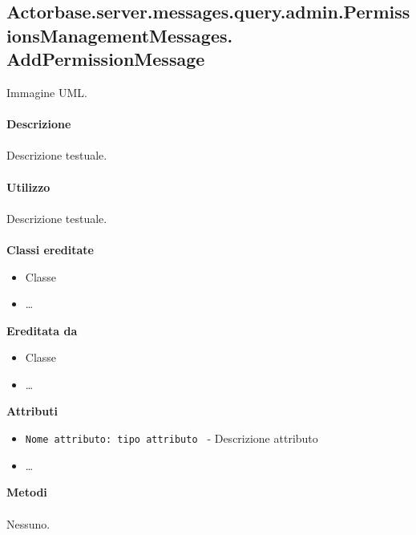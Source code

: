 \documentclass[a4paper]{article}
\begin{document}
\subsection{Actorbase.server.messages.query.admin.PermissionsManagementMessages.
\newline AddPermissionMessage}
		Immagine UML.
		\\ \\
		\textbf{Descrizione}
			\\ \\
			Descrizione testuale.
			\\ \\
		\textbf{Utilizzo}
			\\ \\
			Descrizione testuale.
			\\ \\
		\textbf{Classi ereditate}
			\begin{itemize}
				\item Classe
				\item \dots
			\end{itemize}
		\textbf{Ereditata da}
			\begin{itemize}
				\item Classe
				\item \dots
			\end{itemize}
		\textbf{Attributi}
			\begin{itemize}
				\item \texttt{Nome attributo: tipo attributo } - Descrizione attributo
				\item \dots
			\end{itemize}
		\textbf{Metodi}
			\\ \\
			Nessuno.
			
\end{document}
